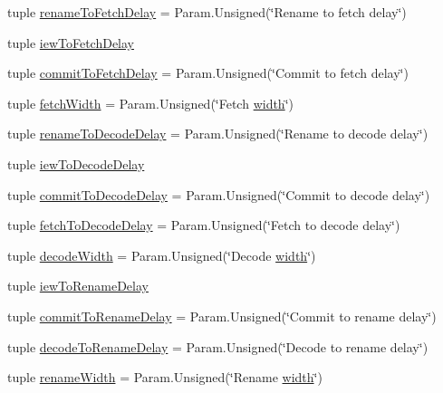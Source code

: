 \begin{DoxyCompactItemize}
tuple \hyperlink{classSimpleOzoneCPU_1_1SimpleOzoneCPU_a8aaf587e0c65d740c68328f587f36b97}{renameToFetchDelay} = Param.Unsigned(\char`\"{}Rename to fetch delay\char`\"{})
\item 
tuple \hyperlink{classSimpleOzoneCPU_1_1SimpleOzoneCPU_a63165fb771c6aa1ecca842abe393a831}{iewToFetchDelay}
\item 
tuple \hyperlink{classSimpleOzoneCPU_1_1SimpleOzoneCPU_aad1963f659c6e9595b5d1ff499e843d8}{commitToFetchDelay} = Param.Unsigned(\char`\"{}Commit to fetch delay\char`\"{})
\item 
tuple \hyperlink{classSimpleOzoneCPU_1_1SimpleOzoneCPU_a0a9358767ec7c9dfef70564672b53522}{fetchWidth} = Param.Unsigned(\char`\"{}Fetch \hyperlink{classSimpleOzoneCPU_1_1SimpleOzoneCPU_a397bb3beea7b21f074bc75e1e71f132f}{width}\char`\"{})
\item 
tuple \hyperlink{classSimpleOzoneCPU_1_1SimpleOzoneCPU_a4cd25aa163add4667be26df636d1d72d}{renameToDecodeDelay} = Param.Unsigned(\char`\"{}Rename to decode delay\char`\"{})
\item 
tuple \hyperlink{classSimpleOzoneCPU_1_1SimpleOzoneCPU_a9876f37ad91dd63a32345b53aafbddc6}{iewToDecodeDelay}
\item 
tuple \hyperlink{classSimpleOzoneCPU_1_1SimpleOzoneCPU_acaab18e678264ee264642b5be0d91157}{commitToDecodeDelay} = Param.Unsigned(\char`\"{}Commit to decode delay\char`\"{})
\item 
tuple \hyperlink{classSimpleOzoneCPU_1_1SimpleOzoneCPU_a10e1e587508ee15562df112d1142b851}{fetchToDecodeDelay} = Param.Unsigned(\char`\"{}Fetch to decode delay\char`\"{})
\item 
tuple \hyperlink{classSimpleOzoneCPU_1_1SimpleOzoneCPU_a52dc575e0588181eb7c3bd1e3d803cfd}{decodeWidth} = Param.Unsigned(\char`\"{}Decode \hyperlink{classSimpleOzoneCPU_1_1SimpleOzoneCPU_a397bb3beea7b21f074bc75e1e71f132f}{width}\char`\"{})
\item 
tuple \hyperlink{classSimpleOzoneCPU_1_1SimpleOzoneCPU_a54dd22869ae708c0b6bffab65d4d03c5}{iewToRenameDelay}
\item 
tuple \hyperlink{classSimpleOzoneCPU_1_1SimpleOzoneCPU_a35c9cdaf793827c316dee784cbf39d96}{commitToRenameDelay} = Param.Unsigned(\char`\"{}Commit to rename delay\char`\"{})
\item 
tuple \hyperlink{classSimpleOzoneCPU_1_1SimpleOzoneCPU_a168896b51e7cc580a9f343e0538ed193}{decodeToRenameDelay} = Param.Unsigned(\char`\"{}Decode to rename delay\char`\"{})
\item 
tuple \hyperlink{classSimpleOzoneCPU_1_1SimpleOzoneCPU_a6500ae95e23f48433d63280c42925a31}{renameWidth} = Param.Unsigned(\char`\"{}Rename \hyperlink{classSimpleOzoneCPU_1_1SimpleOzoneCPU_a397bb3beea7b21f074bc75e1e71f132f}{width}\char`\"{})

\end{DoxyCompactItemize}
